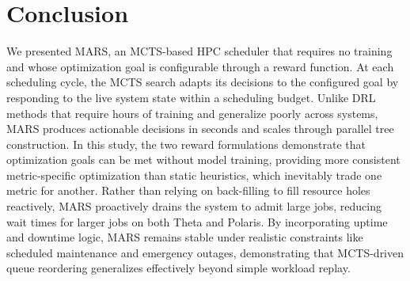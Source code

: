 \documentclass[conference]{IEEEtran}
\begin{document}
\section{Conclusion}

We presented MARS, an MCTS-based HPC scheduler that requires no training and whose optimization goal is configurable through a reward function. At each scheduling cycle, the MCTS search adapts its decisions to the configured goal by responding to the live system state within a scheduling budget. Unlike DRL methods that require hours of training and generalize poorly across systems, MARS produces actionable decisions in seconds and scales through parallel tree construction. 
In this study, the two reward formulations demonstrate that optimization goals can be met without model training, providing more consistent metric-specific optimization than static heuristics, which inevitably trade one metric for another.
Rather than relying on back-filling to fill resource holes reactively, MARS proactively drains the system to admit large jobs, reducing wait times for larger jobs on both Theta and Polaris. 
By incorporating uptime and downtime logic, MARS remains stable under realistic constraints like scheduled maintenance and emergency outages, demonstrating that MCTS-driven queue reordering generalizes effectively beyond simple workload replay.
\end{document}
